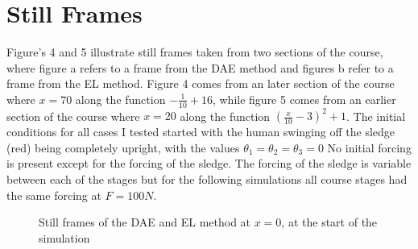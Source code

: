 \documentclass{article}
\begin{document}
\section{Still Frames}
Figure's 4 and 5 illustrate still frames taken from two sections of the course, where figure a refers to a frame from the DAE method and figures b refer to a frame from the EL method. Figure 4 comes from an later section of the course where $x = 70$ along the function $-\frac{1}{10}+16$, while figure 5 comes from an earlier section of the course where $x=20$ along the function $(\frac{x}{10}-3)^2 + 1$. The initial conditions for all cases I tested started with the human swinging off the sledge (red) being completely upright, with the values $\theta_1 = \theta_2 = \theta_3=0$ No initial forcing is present except for the forcing of the sledge. The forcing of the sledge is variable between each of the stages but for the following simulations all course stages had the same forcing at $F = 100N$.

\begin{center}
	\begin{figure}[H]
		\centering
		
		\caption{Still frames of the DAE and EL method at $x=0$, at the start of the simulation}%
		\label{fig:example3}%
	\end{figure}
\end{center}
\end{document}
